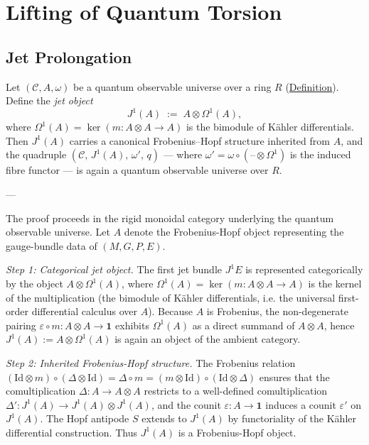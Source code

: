 \chapter{Lifting of Quantum Torsion}
\label{chap:torsion}

\section{Jet Prolongation}
\label{sec:jet-prolongation}

\begin{proposition}
  \label{prop:jet-prolongation}
Let $(\mathcal{C}, A, \omega)$ be a quantum observable universe over a
ring $R$ (\hyperref[def:quantum-observable-universe]{Definition}).  Define the
\emph{jet object}
\[
J^1(A) \;:=\; A \otimes \Omega^1(A),
\]
where $\Omega^1(A) = \ker(m \colon A \otimes A \to A)$ is the bimodule of
Kähler differentials.  Then $J^1(A)$ carries a canonical Frobenius--Hopf
structure inherited from $A$, and the quadruple
$(\mathcal{C},\, J^1(A),\, \omega',\, q)$ --- where
$\omega' = \omega \circ (\text{--} \otimes \Omega^1)$ is the induced fibre
functor --- is again a quantum observable universe over $R$.

---

The proof proceeds in the rigid monoidal category underlying the quantum
observable universe.  Let $A$ denote the Frobenius-Hopf object
representing the gauge-bundle data of $(M,G,P,E)$.

\emph{Step 1: Categorical jet object.}
The first jet bundle $J^1 E$ is represented categorically by the object
$A \otimes \Omega^1(A)$, where
$\Omega^1(A) = \ker(m\colon A\otimes A \to A)$
is the kernel of the multiplication (the bimodule of Kähler
differentials, i.e. the universal first-order differential calculus
over $A$).
Because $A$ is Frobenius, the non-degenerate pairing
$\varepsilon \circ m \colon A \otimes A \to \mathbf{1}$ exhibits
$\Omega^1(A)$ as a direct summand of $A \otimes A$, hence
$J^1(A) := A \otimes \Omega^1(A)$ is again an object of the ambient
category.

\emph{Step 2: Inherited Frobenius-Hopf structure.}
The Frobenius relation
$(\mathrm{Id} \otimes m) \circ (\Delta \otimes \mathrm{Id})
 = \Delta \circ m
 = (m \otimes \mathrm{Id}) \circ (\mathrm{Id} \otimes \Delta)$
ensures that the comultiplication $\Delta\colon A \to A \otimes A$ restricts
to a well-defined comultiplication
$\Delta'\colon J^1(A) \to J^1(A) \otimes J^1(A)$, and the counit
$\varepsilon\colon A \to \mathbf{1}$ induces a counit $\varepsilon'$ on
$J^1(A)$.  The Hopf antipode $S$ extends to $J^1(A)$ by functoriality of the
Kähler differential construction.  Thus $J^1(A)$ is a Frobenius-Hopf object.


\end{proposition}
